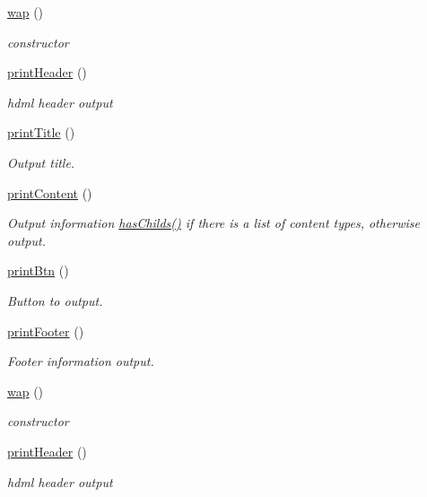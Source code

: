 \begin{DoxyCompactItemize}
\item 
\hyperlink{classwap_a7b4befeef8257c63a0ffe3012a84560b}{wap} ()
\begin{DoxyCompactList}\small\item\em constructor \end{DoxyCompactList}\item 
\hyperlink{classwap_a402c6a180ae759c7a173a67441dfb716}{print\+Header} ()
\begin{DoxyCompactList}\small\item\em hdml header output \end{DoxyCompactList}\item 
\hyperlink{classwap_a048fa1324853c9d69e795c7d34f7ad8b}{print\+Title} ()
\begin{DoxyCompactList}\small\item\em Output title. \end{DoxyCompactList}\item 
\hyperlink{classwap_a1edebe2b6a90ec08ab149ad2b2866dbd}{print\+Content} ()
\begin{DoxyCompactList}\small\item\em Output information \hyperlink{classmobileXE_a680f6a6b774bf12be4c67b6a9215f1ea}{has\+Childs()} if there is a list of content types, otherwise output. \end{DoxyCompactList}\item 
\hyperlink{classwap_a47437aad53e77ce53aebb4db6240cc38}{print\+Btn} ()
\begin{DoxyCompactList}\small\item\em Button to output. \end{DoxyCompactList}\item 
\hyperlink{classwap_a1fd1c1dca866c9b6653499cabf124980}{print\+Footer} ()
\begin{DoxyCompactList}\small\item\em Footer information output. \end{DoxyCompactList}\item 
\hyperlink{classwap_a7b4befeef8257c63a0ffe3012a84560b}{wap} ()
\begin{DoxyCompactList}\small\item\em constructor \end{DoxyCompactList}\item 
\hyperlink{classwap_a402c6a180ae759c7a173a67441dfb716}{print\+Header} ()
\begin{DoxyCompactList}\small\item\em hdml header output \end{DoxyCompactList}\item 

\end{DoxyCompactItemize}
